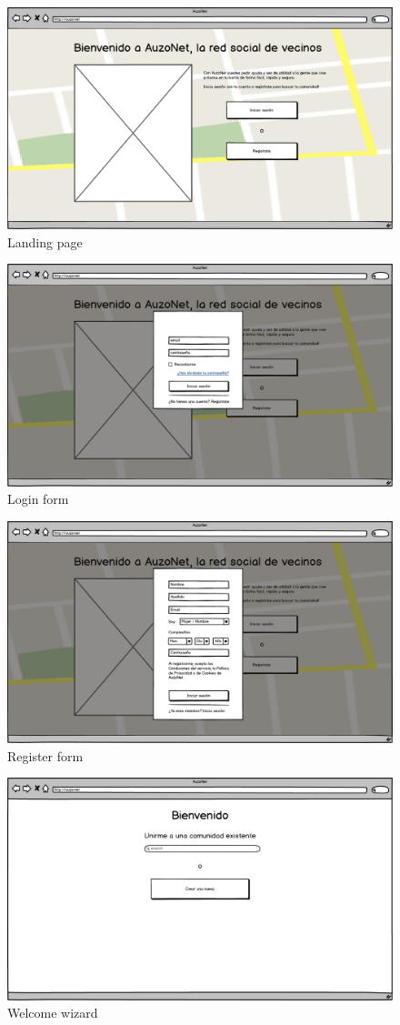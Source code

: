 \documentclass{DeustoFDP}
\begin{document}
\begin{figure}[h!]
	\centering
	\includegraphics[width=0.7\linewidth]{fig/mockups/landing2}
	\caption[Landing page]{Landing page}
	\label{fig:landing2}
\end{figure}

\begin{figure}[h!]
	\centering
	\includegraphics[width=0.7\linewidth]{fig/mockups/landing}
	\caption[Login form]{Login form}
	\label{fig:landing}
\end{figure}

\begin{figure}[h!]
	\centering
	\includegraphics[width=0.7\linewidth]{fig/mockups/register}
	\caption[Register form]{Register form}
	\label{fig:register}
\end{figure}

\begin{figure}[h!]
	\centering
	\includegraphics[width=0.7\linewidth]{fig/mockups/wizard}
	\caption[Welcome wizard]{Welcome wizard}
	\label{fig:wizard}
\end{figure}
\end{document}
